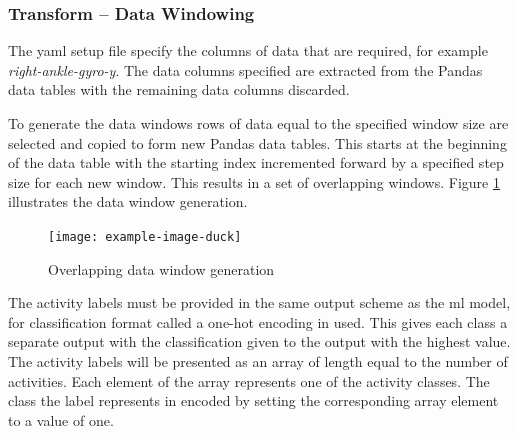\subsubsection{Transform -- Data Windowing}
The \acrshort{yaml} setup file specify the columns of data that are required, for example \textit{right-ankle-gyro-y}. The data columns specified are extracted from the Pandas data tables with the remaining data columns discarded.

To generate the data windows rows of data equal to the specified window size are selected and copied to form new Pandas data tables. This starts at the beginning of the data table with the starting index incremented forward by a specified step size for each new window. This results in a set of overlapping windows. Figure \ref{fig:methods-data-window-generation} illustrates the data window generation.

\begin{figure}[!hbt]
    \centering
    \texttt{[image: example-image-duck]}
    \caption{Overlapping data window generation}
    \label{fig:methods-data-window-generation}
\end{figure}

The activity labels must be provided in the same output scheme as the \acrshort{ml} model, for classification format called a one-hot encoding in used. This gives each class a separate output with the classification given to the output with the highest value. The activity labels will be presented as an array of length equal to the number of activities. Each element of the array represents one of the activity classes. The class the label represents in encoded by setting the corresponding array element to a value of one.


